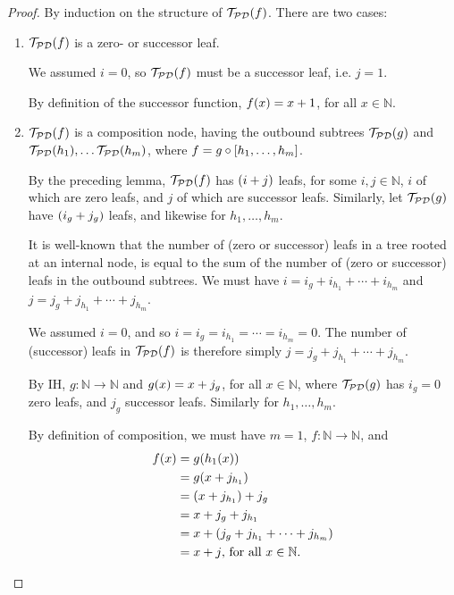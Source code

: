 \begin{proof} By induction on the structure of $\mathcal{T}_\mathcal{PD}{\mathopen{}\left({f}\right)\mathclose{}}$.
There are two cases:\begin{enumerate}[label=(\arabic*)]

\item $\mathcal{T}_\mathcal{PD}{\mathopen{}\left({f}\right)\mathclose{}}$ is a zero- or successor leaf.

We assumed $i = 0$, so $\mathcal{T}_\mathcal{PD}{\mathopen{}\left({f}\right)\mathclose{}}$ must be a successor
leaf, i.e. $j=1$.

By definition of the successor function, $f{\mathopen{}\left({x}\right)\mathclose{}} = x + 1$, for all $x \in
\mathbb{N}$.

\item $\mathcal{T}_\mathcal{PD}{\mathopen{}\left({f}\right)\mathclose{}}$ is a composition node, having the
outbound subtrees $\mathcal{T}_\mathcal{PD}{\mathopen{}\left({g}\right)\mathclose{}}$ and
$\mathcal{T}_\mathcal{PD}{\mathopen{}\left({h_1}\right)\mathclose{}}, \ldots \mathcal{T}_\mathcal{PD}{\mathopen{}\left({h_m}\right)\mathclose{}}$,
where $f = g \circ \mathopen{}\left[{h_1, \ldots, h_m}\right]\mathclose{}$.

By the preceding lemma, $\mathcal{T}_\mathcal{PD}{\mathopen{}\left({f}\right)\mathclose{}}$ has ${\mathopen{}\left({i+j}\right)\mathclose{}}$ leafs,
for some $i, j \in \mathbb{N}$, $i$ of which are zero leafs, and $j$ of which
are successor leafs.  Similarly, let $\mathcal{T}_\mathcal{PD}{\mathopen{}\left({g}\right)\mathclose{}}$ have
${\mathopen{}\left({i_g + j_g}\right)\mathclose{}}$ leafs, and likewise for $h_1,\ldots,h_m$.

It is well-known that the number of (zero or successor) leafs in a tree rooted
at an internal node, is equal to the sum of the number of (zero or successor)
leafs in the outbound subtrees. We must have $i = i_g + i_{h_1} + \cdots +
i_{h_m}$ and $j = j_g + j_{h_1} + \cdots + j_{h_m}$.

We assumed $i = 0$, and so $i = i_g = i_{h_1} = \cdots = i_{h_m} = 0$. The
number of (successor) leafs in $\mathcal{T}_\mathcal{PD}{\mathopen{}\left({f}\right)\mathclose{}}$ is therefore
simply $j = j_g + j_{h_1} + \cdots + j_{h_m}$.

By IH, $g : \mathbb{N} \rightarrow \mathbb{N}$ and $g{\mathopen{}\left({x}\right)\mathclose{}} = x + j_g$, for all
$x \in \mathbb{N}$, where $\mathcal{T}_\mathcal{PD}{\mathopen{}\left({g}\right)\mathclose{}}$ has $i_g = 0$ zero
leafs, and $j_g$ successor leafs. Similarly for $h_1, \ldots, h_m$.

By definition of composition, we must have $m=1$, $f : \mathbb{N} \rightarrow
\mathbb{N}$, and\begin{align*}
%
f\p{x}  &= g\p{h_1\p{x}} \\
        &= g\p{x + j_{h_1}} \\
        &= \p{x + j_{h_1}} + j_g \\
        &= x + j_g + j_{h_1} \\
        &= x + \p{j_g + j_{h_1} + \cdots + j_{h_m}} \\
        &= x + j \text{, for all $x \in \mathbb{N}$.}
%
\end{align*}\end{enumerate}\end{proof}

